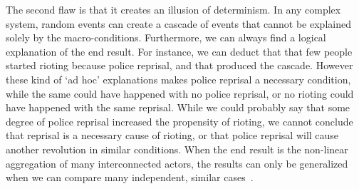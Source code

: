 The second flaw is that it creates an illusion of determinism.
In any complex system, random events can create a cascade of events that cannot be explained solely by the macro-conditions. 
Furthermore, we can always find a logical explanation of the end result.
For instance, we can deduct that that few people started rioting because police reprisal, and that produced the cascade.
However these kind of `ad hoc' explanations makes police reprisal a necessary condition, 
while the same could have happened with no police reprisal, 
or no rioting could have happened with the same reprisal.
While we could probably say that some degree of police reprisal increased the propensity of rioting,
we cannot conclude that reprisal is a necessary cause of rioting,
or that police reprisal will cause another revolution in similar conditions.
When the end result is the non-linear aggregation of many interconnected actors,
the results can only be generalized
when we can compare many independent, similar cases~\citep{watts2007}.


